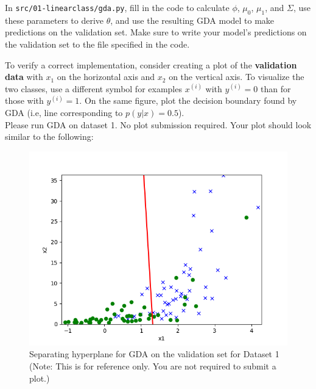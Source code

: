 \item {}
In \texttt{src/01-linearclass/gda.py}, fill in the code to calculate $\phi$, $\mu_{0}$, $\mu_{1}$, and $\Sigma$, use these parameters to derive $\theta$, and use the resulting GDA model to make predictions on the validation set. Make sure to write your model's predictions on the validation set to the file specified in the code.

To verify a correct implementation, consider creating a plot of the \textbf{validation data} with $x_1$ on the horizontal axis and $x_2$ on the vertical axis. To visualize the two classes, use a different symbol for examples $x^{(i)}$ with $y^{(i)} = 0$ than for those with $y^{(i)} = 1$. On the same figure, plot the decision boundary found by GDA (i.e, line corresponding to $p(y\vert x) = 0.5$).\\

Please run GDA on dataset 1. No plot submission required. Your plot should look similar to the following:

\begin{figure}[H]
	\centering
	\vspace{2mm}
	\includegraphics[width=0.65\linewidth]{01-linearclass/p01e_pred_1.png}
    \caption{Separating hyperplane for GDA on the validation set for Dataset 1 (Note: This is for reference only.  You are not required to submit a plot.)}
\end{figure}
